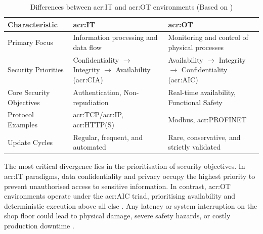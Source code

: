  \begin{table}[H]
 	\caption[Differences between \gls{acr:IT} and \gls{acr:OT} environments]{Differences between \gls{acr:IT} and \gls{acr:OT} environments (Based on \cite{hwi_ot_definition} \cite[p. 1, 199]{8586807})}
 	\label{tab:it_ot_comparison}
 	\centering
 	\begin{tabularx}{\textwidth}{l X X}
 		\toprule  
 		\textbf{Characteristic} & \textbf{\gls{acr:IT}} & \textbf{\gls{acr:OT}} \\ 
 		\midrule
 		Primary Focus & Information processing and data flow & Monitoring and control of physical processes \\ \addlinespace
 		Security Priorities & Confidentiality $\rightarrow$ \newline Integrity $\rightarrow$ \newline Availability (\acrshort{acr:CIA}) & Availability $\rightarrow$ \newline Integrity $\rightarrow$ \newline Confidentiality (\acrshort{acr:AIC}) \\ \addlinespace
 		Core Security Objectives & Authentication, \newline Non-repudiation & Real-time availability, \newline Functional Safety \\ \addlinespace
 		Protocol Examples & \acrshort{acr:TCP}/\gls{acr:IP}, \newline \acrshort{acr:HTTP}(S) & Modbus, \newline \acrshort{acr:PROFINET} \\ \addlinespace
 		Update Cycles & Regular, frequent, and automated & Rare, conservative, and strictly validated \\ 
 		\bottomrule  
 	\end{tabularx}
 \end{table}
 

The most critical divergence lies in the prioritisation of security objectives. In \gls{acr:IT} paradigms, data confidentiality and privacy occupy the highest priority to prevent unauthorised access to sensitive information. In contrast, \gls{acr:OT} environments operate under the \gls{acr:AIC} triad, prioritising availability and deterministic execution above all else \cite[p. 199]{8586807}. Any latency or system interruption on the shop floor could lead to physical damage, severe safety hazards, or costly production downtime \cite[p. 1]{8586807} \cite{hwi_ot_definition}.

